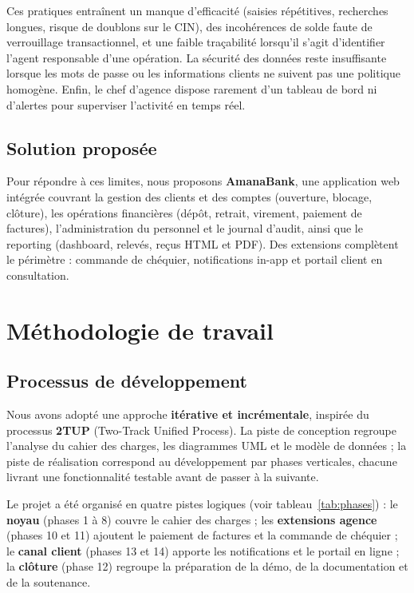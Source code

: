\documentclass[11pt,a4paper,oneside]{report}
\newcommand{\nomapplication}{AmanaBank}
\begin{document}
Ces pratiques entraînent un manque d'efficacité (saisies répétitives, recherches longues, risque de doublons sur le CIN), des incohérences de solde faute de verrouillage transactionnel, et une faible traçabilité lorsqu'il s'agit d'identifier l'agent responsable d'une opération. La sécurité des données reste insuffisante lorsque les mots de passe ou les informations clients ne suivent pas une politique homogène. Enfin, le chef d'agence dispose rarement d'un tableau de bord ni d'alertes pour superviser l'activité en temps réel.

\subsection{Solution proposée}

Pour répondre à ces limites, nous proposons \textbf{\nomapplication}, une application web intégrée couvrant la gestion des clients et des comptes (ouverture, blocage, clôture), les opérations financières (dépôt, retrait, virement, paiement de factures), l'administration du personnel et le journal d'audit, ainsi que le reporting (dashboard, relevés, reçus HTML et PDF). Des extensions complètent le périmètre : commande de chéquier, notifications in-app et portail client en consultation.

\section{Méthodologie de travail}

\subsection{Processus de développement}

Nous avons adopté une approche \textbf{itérative et incrémentale}, inspirée du processus \textbf{2TUP} (Two-Track Unified Process). La piste de conception regroupe l'analyse du cahier des charges, les diagrammes UML et le modèle de données ; la piste de réalisation correspond au développement par phases verticales, chacune livrant une fonctionnalité testable avant de passer à la suivante.

Le projet a été organisé en quatre pistes logiques (voir tableau~\ref{tab:phases}) : le \textbf{noyau} (phases 1 à 8) couvre le cahier des charges ; les \textbf{extensions agence} (phases 10 et 11) ajoutent le paiement de factures et la commande de chéquier ; le \textbf{canal client} (phases 13 et 14) apporte les notifications et le portail en ligne ; la \textbf{clôture} (phase 12) regroupe la préparation de la démo, de la documentation et de la soutenance.
\end{document}
